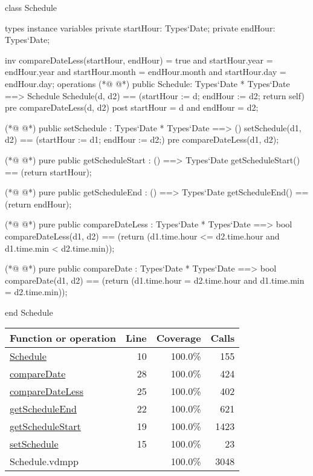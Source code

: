 \begin{vdmpp}[breaklines=true]
class Schedule

types
instance variables
  private startHour: Types`Date;
  private endHour: Types`Date;
  
  inv compareDateLess(startHour, endHour) = true and startHour.year = endHour.year and startHour.month = endHour.month and startHour.day = endHour.day;
operations 
(*@
\label{Schedule:10}
@*)
 public Schedule: Types`Date * Types`Date ==> Schedule
  Schedule(d, d2) == (startHour := d; endHour := d2; return self)
 pre compareDateLess(d, d2)
 post startHour = d and endHour = d2;
 
(*@
\label{setSchedule:15}
@*)
 public setSchedule : Types`Date * Types`Date ==> ()
  setSchedule(d1, d2) == (startHour := d1; endHour := d2;)
 pre compareDateLess(d1, d2);
  
(*@
\label{getScheduleStart:19}
@*)
 pure public getScheduleStart : () ==> Types`Date
  getScheduleStart() == (return startHour);
  
(*@
\label{getScheduleEnd:22}
@*)
 pure public getScheduleEnd : () ==> Types`Date
  getScheduleEnd() == (return endHour);
  
(*@
\label{compareDateLess:25}
@*)
 pure public compareDateLess : Types`Date * Types`Date ==> bool
  compareDateLess(d1, d2) == (return (d1.time.hour <= d2.time.hour and d1.time.min < d2.time.min));
  
(*@
\label{compareDate:28}
@*)
 pure public compareDate : Types`Date * Types`Date ==> bool
  compareDate(d1, d2) == (return (d1.time.hour = d2.time.hour and d1.time.min = d2.time.min));

end Schedule
\end{vdmpp}
\bigskip
\begin{longtable}{|l|r|r|r|}
\hline
Function or operation & Line & Coverage & Calls \\
\hline
\hline
\hyperref[Schedule:10]{Schedule} & 10&100.0\% & 155 \\
\hline
\hyperref[compareDate:28]{compareDate} & 28&100.0\% & 424 \\
\hline
\hyperref[compareDateLess:25]{compareDateLess} & 25&100.0\% & 402 \\
\hline
\hyperref[getScheduleEnd:22]{getScheduleEnd} & 22&100.0\% & 621 \\
\hline
\hyperref[getScheduleStart:19]{getScheduleStart} & 19&100.0\% & 1423 \\
\hline
\hyperref[setSchedule:15]{setSchedule} & 15&100.0\% & 23 \\
\hline
\hline
Schedule.vdmpp & & 100.0\% & 3048 \\
\hline
\end{longtable}

